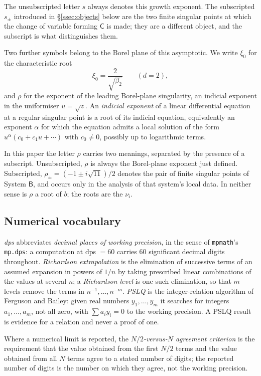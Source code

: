 The unsubscripted letter $s$ always denotes this growth exponent. The
subscripted $s_\pm$ introduced in \S\ref{ssec:objects} below are the two
finite singular points at which the change of variable forming $\mathsf C$ is
made; they are a different object, and the subscript is what distinguishes
them.

Two further symbols belong to the Borel plane of this asymptotic. We write
$\xi_0$ for the characteristic root
\[
  \xi_0=\frac{2}{\sqrt{\beta_2}}\qquad(d=2),
\]
and $\rho$ for the exponent of the leading Borel-plane singularity, an indicial
exponent in the uniformiser $u=\sqrt z$. An \emph{indicial exponent} of a
linear differential equation at a regular singular point is a root of its
indicial equation, equivalently an exponent $\alpha$ for which the equation
admits a local solution of the form $u^{\alpha}(c_0+c_1u+\cdots)$ with
$c_0\neq0$, possibly up to logarithmic terms.

In this paper the letter $\rho$ carries two meanings, separated by the
presence of a subscript. Unsubscripted, $\rho$ is always the Borel-plane
exponent just defined. Subscripted, $\rho_\pm=(-1\pm i\sqrt{11})/2$ denotes
the pair of finite singular points of System $\mathsf B$, and occurs only in
the analysis of that system's local data. In neither sense is $\rho$ a root of
$b$; the roots are the $\nu_i$.

\subsection{Numerical vocabulary}\label{ssec:numerics}

\emph{dps} abbreviates \emph{decimal places of working precision}, in the sense
of \texttt{mpmath}'s \texttt{mp.dps}: a computation at dps $=60$ carries $60$
significant decimal digits throughout. \emph{Richardson extrapolation} is the
elimination of successive terms of an assumed expansion in powers of $1/n$ by
taking prescribed linear combinations of the values at several $n$; a
\emph{Richardson level} is one such elimination, so that $m$ levels remove the
terms in $n^{-1},\dots,n^{-m}$. \emph{PSLQ} is the integer-relation algorithm
of Ferguson and Bailey: given real numbers $y_1,\dots,y_m$ it searches for
integers $a_1,\dots,a_m$, not all zero, with $\sum a_i y_i=0$ to the working
precision. A PSLQ result is evidence for a relation and never a proof of one.

Where a numerical limit is reported, the \emph{$N/2$-versus-$N$ agreement
criterion} is the requirement that the value obtained from the first $N/2$
terms and the value obtained from all $N$ terms agree to a stated number of
digits; the reported number of digits is the number on which they agree, not
the working precision.

